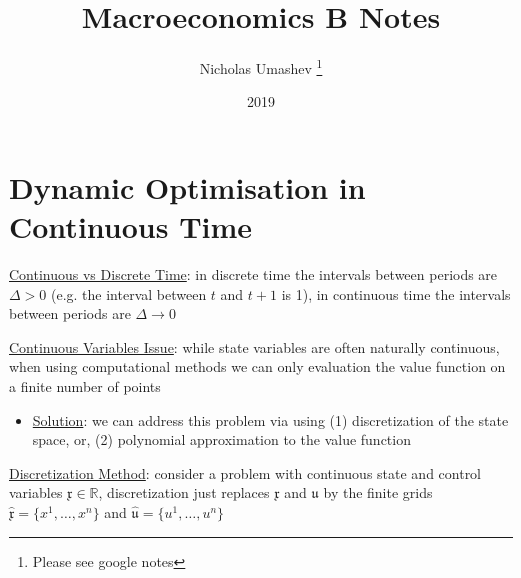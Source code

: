 \documentclass{article}
\title{Macroeconomics B Notes}
\author{Nicholas Umashev \footnote{Please see google notes}}
\date{2019}
\begin{document}
\maketitle

\section{Dynamic Optimisation in Continuous Time}

\par \underline{Continuous vs Discrete Time}: in discrete time the intervals between periods are $\Delta>0$ (e.g. the interval between $t$ and $t+1$ is 1), in continuous time the intervals between periods are $\Delta \rightarrow 0$
\par \underline{Continuous Variables Issue}: while state variables are often naturally continuous, when using computational methods we can only evaluation the value function  on a finite number of points
\begin{itemize}
    \item \underline{Solution}: we can address this problem via using (1) discretization of the state space, or, (2) polynomial approximation to the value function
\end{itemize}
\par \underline{Discretization Method}: consider a problem with continuous state and control variables $\mathfrak{x} \in \mathbb{R}$, discretization just replaces $\mathfrak{x}$ and $\mathfrak{u}$ by the finite grids $\widehat{\mathfrak{x}} = \{ x^{1}, \dots, x^{n} \}$ and $\widehat{\mathfrak{u}} = \{ u^{1}, \dots, u^{n} \}$
\end{document}
